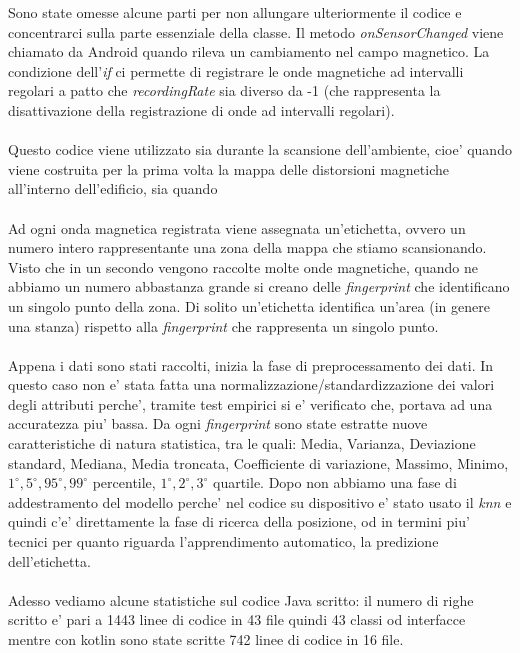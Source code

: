Sono state omesse alcune parti per non allungare ulteriormente il codice e concentrarci sulla parte essenziale della classe. Il metodo \textit{onSensorChanged} viene chiamato da Android quando rileva un cambiamento nel campo magnetico. La condizione dell'\textit{if} ci permette di registrare le onde magnetiche ad intervalli regolari a patto che \textit{recordingRate} sia diverso da -1 (che rappresenta la  disattivazione della registrazione di onde ad intervalli regolari).
\\\\
Questo codice viene utilizzato sia durante la scansione dell'ambiente, cioe' quando viene costruita per la prima volta la mappa delle distorsioni magnetiche all'interno dell'edificio, sia quando 
\\\\
Ad ogni onda magnetica registrata viene assegnata un'etichetta, ovvero un numero intero rappresentante una zona della mappa che stiamo scansionando. Visto che in un secondo vengono raccolte molte onde magnetiche, quando ne abbiamo un numero abbastanza grande si creano delle \textit{fingerprint} che identificano un singolo punto della zona. Di solito un'etichetta identifica un'area (in genere una stanza) rispetto alla \textit{fingerprint} che rappresenta un singolo punto.
\\\\
Appena i dati sono stati raccolti, inizia la fase di preprocessamento dei dati. In questo caso non e' stata fatta una normalizzazione/standardizzazione dei valori degli attributi perche', tramite test empirici si e' verificato che, portava ad una accuratezza piu' bassa. Da ogni \textit{fingerprint} sono state estratte nuove caratteristiche di natura statistica, tra le quali: Media, Varianza, Deviazione standard, Mediana, Media troncata, Coefficiente di variazione, Massimo, Minimo, $ 1^{\circ}, 5^{\circ}, 95^{\circ}, 99^{\circ} $ percentile, $ 1^{\circ}, 2^{\circ}, 3^{\circ} $ quartile.
Dopo non abbiamo una fase di addestramento del modello perche' nel codice su dispositivo  e' stato usato il \textit{knn} e quindi c'e' direttamente la fase di ricerca della posizione, od in termini piu' tecnici per quanto riguarda l'apprendimento automatico, la predizione dell'etichetta.
\\\\
Adesso vediamo alcune statistiche sul codice Java scritto: il numero di righe scritto e' pari a 1443 linee di codice in 43 file quindi 43 classi od interfacce mentre con kotlin sono state scritte 742 linee di codice in 16 file.


